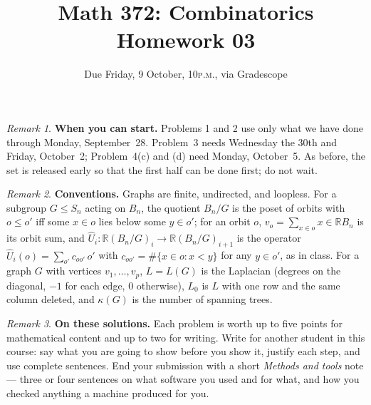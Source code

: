 \documentclass[11pt,twoside]{amsart}
\title{Math 372: Combinatorics\\ Homework 03}
\author{Due Friday, 9 October, 10\textsc{p.m.}, via Gradescope}
\theoremstyle{plain}
\theoremstyle{remark}
\newtheorem*{rmk*}{Remark}
\theoremstyle{definition}
\newcommand{\RR}{\mathbb{R}}
\newcommand{\kap}{\kappa}
\newcommand{\Uh}{\widehat U}
\begin{document}
\maketitle

\begin{rmk*}
\textbf{When you can start.} Problems 1 and 2 use only what we have done through Monday,
September~28. Problem~3 needs Wednesday the 30th and Friday, October~2; Problem~4(c) and (d)
need Monday, October~5. As before, the set is released early so that the first half can be
done first; do not wait.
\end{rmk*}

\begin{rmk*}
\textbf{Conventions.} Graphs are finite, undirected, and loopless. For a subgroup $G\le S_n$
acting on $B_n$, the quotient $B_n/G$ is the poset of orbits with $o\le o'$ iff some
$x\in o$ lies below some $y\in o'$; for an orbit $o$, $v_o=\sum_{x\in o}x\in\RR B_n$ is its
orbit sum, and $\Uh_i\colon\RR(B_n/G)_i\to\RR(B_n/G)_{i+1}$ is the operator
$\Uh_i(o)=\sum_{o'}c_{oo'}\,o'$ with $c_{oo'}=\#\{x\in o: x<y\}$ for any $y\in o'$, as in
class. For a graph $G$ with vertices $v_1,\dots,v_p$, $L=L(G)$ is the Laplacian (degrees on the
diagonal, $-1$ for each edge, $0$ otherwise), $L_0$ is $L$ with one row and the same column
deleted, and $\kap(G)$ is the number of spanning trees.
\end{rmk*}

\begin{rmk*}
\textbf{On these solutions.} Each problem is worth up to five points for mathematical content
and up to two for writing. Write for another student in this course: say what you are going to
show before you show it, justify each step, and use complete sentences. End your submission with
a short \emph{Methods and tools} note --- three or four sentences on what software you used and
for what, and how you checked anything a machine produced for you.
\end{rmk*}
\end{document}
